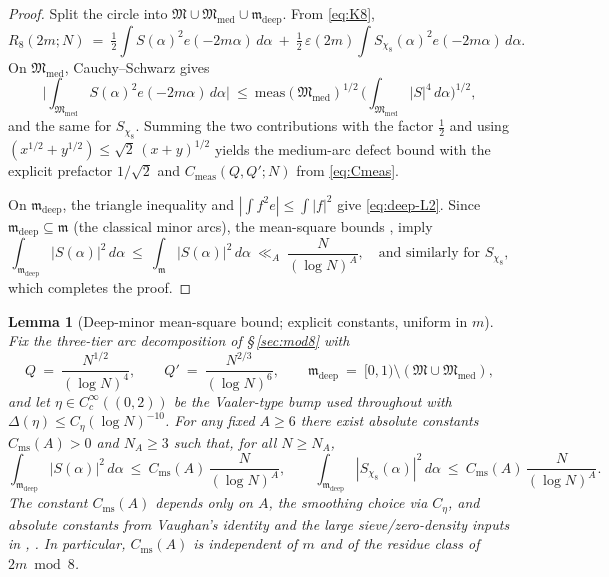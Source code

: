 \documentclass[11pt]{article}
\newtheorem{lemma}[theorem]{Lemma}
\theoremstyle{definition}
\theoremstyle{remark}
\begin{document}
\begin{proof}
Split the circle into $\mathfrak M\cup \mathfrak M_{\mathrm{med}}\cup \mathfrak m_{\mathrm{deep}}$. From \eqref{eq:K8},
\[
R_8(2m;N)\ =\ \tfrac12\int S(\alpha)^2 e(-2m\alpha)\,d\alpha\ +\ \tfrac12\,\varepsilon(2m)\int S_{\chi_8}(\alpha)^2 e(-2m\alpha)\,d\alpha.
\]
On $\mathfrak M_{\mathrm{med}}$, Cauchy–Schwarz gives
\[
\Big|\int_{\mathfrak M_{\mathrm{med}}}\! S(\alpha)^2 e(-2m\alpha)\,d\alpha\Big|\ \le\ \mathrm{meas}(\mathfrak M_{\mathrm{med}})^{1/2}\,\Big(\int_{\mathfrak M_{\mathrm{med}}}|S|^4\,d\alpha\Big)^{1/2},
\]
and the same for $S_{\chi_8}$. Summing the two contributions with the factor $\tfrac12$ and using $(x^{1/2}{+}y^{1/2})\le \sqrt2\,(x{+}y)^{1/2}$ yields the medium-arc defect bound with the explicit prefactor $1/\sqrt2$ and $C_{\mathrm{meas}}(Q,Q';N)$ from \eqref{eq:Cmeas}.

On $\mathfrak m_{\mathrm{deep}}$, the triangle inequality and $|\int f^2 e|\le \int |f|^2$ give \eqref{eq:deep-L2}. Since $\mathfrak m_{\mathrm{deep}}\subseteq\mathfrak m$ (the classical minor arcs), the mean-square bounds \cite[Ch.~13]{MontgomeryVaughan2007}, \cite[Ch.~3]{Vaughan1997} imply
\[
\int_{\mathfrak m_{\mathrm{deep}}}\!|S(\alpha)|^2\,d\alpha\ \le\ \int_{\mathfrak m}\!|S(\alpha)|^2\,d\alpha\ \ll_A\ \frac{N}{(\log N)^A},\quad\text{and similarly for }S_{\chi_8},
\]
which completes the proof.
\end{proof}

\medskip
\begin{lemma}[Deep-minor mean-square bound; explicit constants, uniform in $m$]\label{lem:deep-L2-explicit}
Fix the three-tier arc decomposition of \S\,\ref{sec:mod8} with
\[
  Q\ =\ \frac{N^{1/2}}{(\log N)^4},\qquad Q'\ =\ \frac{N^{2/3}}{(\log N)^6},\qquad \mathfrak m_{\mathrm{deep}}\ =\ [0,1)\setminus(\mathfrak M\cup \mathfrak M_{\mathrm{med}}),
\]
and let $\eta\in C_c^{\infty}((0,2))$ be the Vaaler-type bump used throughout with $\Delta(\eta)\le C_{\eta}(\log N)^{-10}$. For any fixed $A\ge 6$ there exist absolute constants $C_{\mathrm{ms}}(A)>0$ and $N_A\ge 3$ such that, for all $N\ge N_A$,
\[
  \int_{\mathfrak m_{\mathrm{deep}}}\!|S(\alpha)|^2\,d\alpha\ \le\ C_{\mathrm{ms}}(A)\,\frac{N}{(\log N)^A},\qquad
  \int_{\mathfrak m_{\mathrm{deep}}}\!|S_{\chi_8}(\alpha)|^2\,d\alpha\ \le\ C_{\mathrm{ms}}(A)\,\frac{N}{(\log N)^A}.
\]
The constant $C_{\mathrm{ms}}(A)$ depends only on $A$, the smoothing choice via $C_{\eta}$, and absolute constants from Vaughan's identity and the large sieve/zero-density inputs in \cite[Ch.~13]{MontgomeryVaughan2007}, \cite[Ch.~3]{Vaughan1997}. In particular, $C_{\mathrm{ms}}(A)$ is independent of $m$ and of the residue class of $2m\bmod 8$.
\end{lemma}
\end{document}
